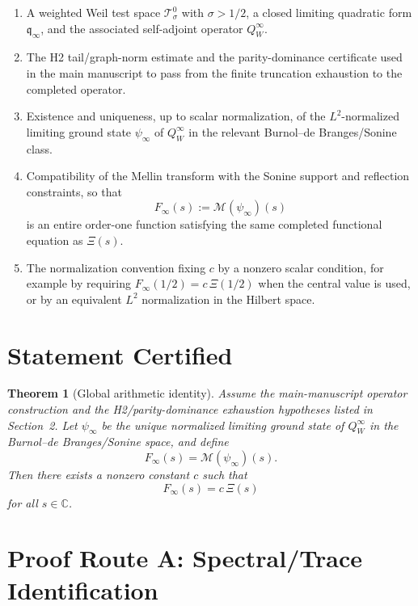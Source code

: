 \documentclass[11pt]{article}
\newtheorem{theorem}{Theorem}
\newcommand{\XiF}{\Xi}
\newcommand{\Finf}{F_{\infty}}
\newcommand{\psiinf}{\psi_{\infty}}
\newcommand{\Mell}{\mathcal{M}}
\newcommand{\QWinf}{Q_{W}^{\infty}}
\begin{document}
\begin{enumerate}[label=(H\arabic*)]
  \item A weighted Weil test space $\mathcal{T}_{\sigma}^{0}$ with
  $\sigma>1/2$, a closed limiting quadratic form $\mathfrak q_{\infty}$,
  and the associated self-adjoint operator $\QWinf$.

  \item The H2 tail/graph-norm estimate and the parity-dominance certificate
  used in the main manuscript to pass from the finite truncation exhaustion to
  the completed operator.

  \item Existence and uniqueness, up to scalar normalization, of the
  $L^{2}$-normalized limiting ground state $\psiinf$ of $\QWinf$ in the
  relevant Burnol--de Branges/Sonine class.

  \item Compatibility of the Mellin transform with the Sonine support and
  reflection constraints, so that
  \[
    \Finf(s) := \Mell(\psiinf)(s)
  \]
  is an entire order-one function satisfying the same completed functional
  equation as $\XiF(s)$.

  \item The normalization convention fixing $c$ by a nonzero scalar condition,
  for example by requiring $\Finf(1/2)=c\,\XiF(1/2)$ when the central value is
  used, or by an equivalent $L^{2}$ normalization in the Hilbert space.
\end{enumerate}

\section{Statement Certified}

\begin{theorem}[Global arithmetic identity]
Assume the main-manuscript operator construction and the H2/parity-dominance
exhaustion hypotheses listed in Section~2.  Let $\psiinf$ be the unique
normalized limiting ground state of $\QWinf$ in the Burnol--de Branges/Sonine
space, and define
\[
  \Finf(s)=\Mell(\psiinf)(s).
\]
Then there exists a nonzero constant $c$ such that
\[
  \Finf(s)=c\,\XiF(s)
\]
for all $s\in\mathbb C$.
\end{theorem}

\section{Proof Route A: Spectral/Trace Identification}
\end{document}
